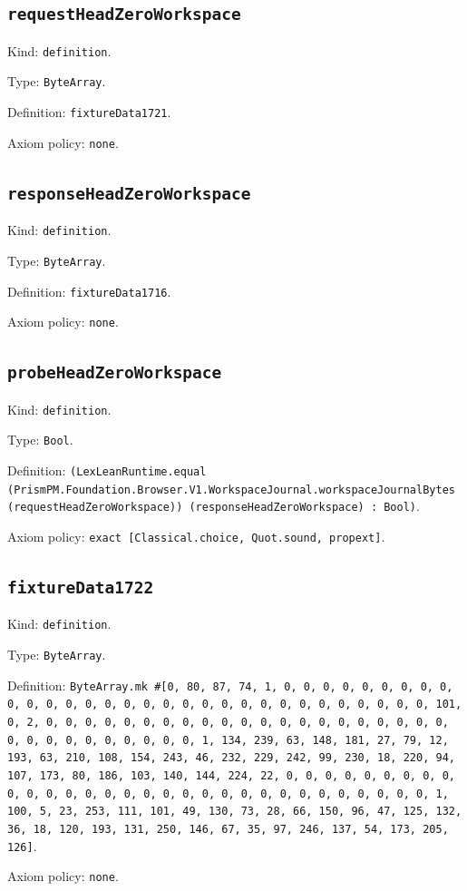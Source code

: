 \documentclass[11pt]{article}
\begin{document}
\subsection*{\texttt{requestHeadZeroWorkspace}}
\noindent Kind: \texttt{definition}.\par
\noindent Type: \texttt{ByteArray}.\par
\noindent Definition: \texttt{fixtureData1721}.\par
\noindent Axiom policy: \texttt{none}.\par
\subsection*{\texttt{responseHeadZeroWorkspace}}
\noindent Kind: \texttt{definition}.\par
\noindent Type: \texttt{ByteArray}.\par
\noindent Definition: \texttt{fixtureData1716}.\par
\noindent Axiom policy: \texttt{none}.\par
\subsection*{\texttt{probeHeadZeroWorkspace}}
\noindent Kind: \texttt{definition}.\par
\noindent Type: \texttt{Bool}.\par
\noindent Definition: \texttt{(LexLeanRuntime.equal (PrismPM.Foundation.Browser.V1.WorkspaceJournal.workspaceJournalBytes (requestHeadZeroWorkspace)) (responseHeadZeroWorkspace) : Bool)}.\par
\noindent Axiom policy: \texttt{exact [Classical.choice, Quot.sound, propext]}.\par
\subsection*{\texttt{fixtureData1722}}
\noindent Kind: \texttt{definition}.\par
\noindent Type: \texttt{ByteArray}.\par
\noindent Definition: \texttt{ByteArray.mk \#[0, 80, 87, 74, 1, 0, 0, 0, 0, 0, 0, 0, 0, 0, 0, 0, 0, 0, 0, 0, 0, 0, 0, 0, 0, 0, 0, 0, 0, 0, 0, 0, 0, 0, 0, 0, 101, 0, 2, 0, 0, 0, 0, 0, 0, 0, 0, 0, 0, 0, 0, 0, 0, 0, 0, 0, 0, 0, 0, 0, 0, 0, 0, 0, 0, 0, 0, 0, 0, 0, 1, 134, 239, 63, 148, 181, 27, 79, 12, 193, 63, 210, 108, 154, 243, 46, 232, 229, 242, 99, 230, 18, 220, 94, 107, 173, 80, 186, 103, 140, 144, 224, 22, 0, 0, 0, 0, 0, 0, 0, 0, 0, 0, 0, 0, 0, 0, 0, 0, 0, 0, 0, 0, 0, 0, 0, 0, 0, 0, 0, 0, 0, 0, 0, 1, 100, 5, 23, 253, 111, 101, 49, 130, 73, 28, 66, 150, 96, 47, 125, 132, 36, 18, 120, 193, 131, 250, 146, 67, 35, 97, 246, 137, 54, 173, 205, 126]}.\par
\noindent Axiom policy: \texttt{none}.\par
\end{document}
